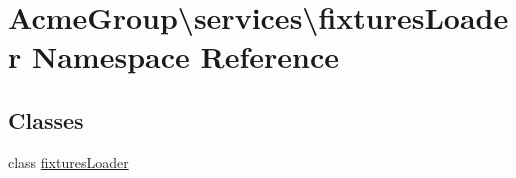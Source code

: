 \hypertarget{namespace_acme_group_1_1services_1_1fixtures_loader}{\section{Acme\+Group\textbackslash{}services\textbackslash{}fixtures\+Loader Namespace Reference}
\label{namespace_acme_group_1_1services_1_1fixtures_loader}
}
\subsection*{Classes}
\begin{DoxyCompactItemize}
\item 
class \hyperlink{class_acme_group_1_1services_1_1fixtures_loader_1_1fixtures_loader}{fixtures\+Loader}
\end{DoxyCompactItemize}
